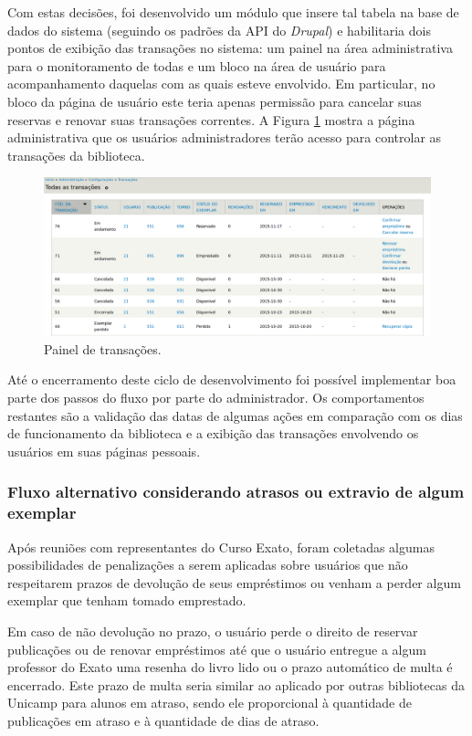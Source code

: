 \documentclass[a4paper]{article}
\begin{document}
Com estas decisões, foi desenvolvido um módulo que insere tal tabela na base de dados do sistema (seguindo os padrões da API do \textit{Drupal}) e habilitaria dois pontos de exibição das transações no sistema: um painel na área administrativa para o monitoramento de todas e um bloco na área de usuário para acompanhamento daquelas com as quais esteve envolvido. Em particular, no bloco da página de usuário este teria apenas permissão para cancelar suas reservas e renovar suas transações correntes. A Figura \ref{transactions} mostra a página administrativa que os usuários administradores terão acesso para controlar as transações da biblioteca.

\begin{figure}[pbth!]
\centering
\includegraphics[width=140mm, trim={35mm 0 30mm 20mm}, clip]{img/transactions.png}
\caption{Painel de transações.\label{transactions}}
\end{figure}

Até o encerramento deste ciclo de desenvolvimento foi possível implementar boa parte dos passos do fluxo por parte do administrador. Os comportamentos restantes são a validação das datas de algumas ações em comparação com os dias de funcionamento da biblioteca e a exibição das transações envolvendo os usuários em suas páginas pessoais.

\subsubsection{Fluxo alternativo considerando atrasos ou extravio de algum exemplar}\label{sssec:overdue_or_lost}
Após reuniões com representantes do Curso Exato, foram coletadas algumas possibilidades de penalizações a serem aplicadas sobre usuários que não respeitarem prazos de devolução de seus empréstimos ou venham a perder algum exemplar que tenham tomado emprestado.

Em caso de não devolução no prazo, o usuário perde o direito de reservar publicações ou de renovar empréstimos até que o usuário entregue a algum professor do Exato uma resenha do livro lido ou o prazo automático de multa é encerrado. Este prazo de multa seria similar ao aplicado por outras bibliotecas da Unicamp para alunos em atraso, sendo ele proporcional à quantidade de publicações em atraso e à quantidade de dias de atraso.
\end{document}
